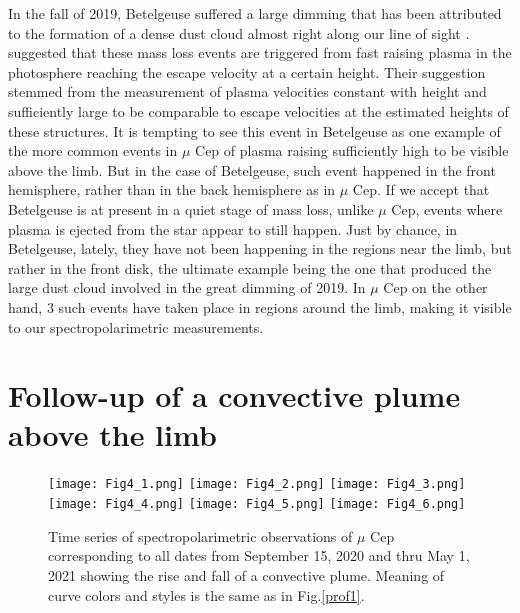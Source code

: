 \documentclass{/Users/art2/TeX/aanda/aa}
\begin{document}
In the fall of 2019, Betelgeuse suffered a large dimming that has been attributed to the formation of a dense dust cloud almost right along our line of sight \citep{montarges_dimming_2021}. \cite{LA22} suggested that these mass loss events are triggered from fast raising plasma in the photosphere reaching the escape velocity at a certain height. Their suggestion stemmed from the measurement of plasma velocities constant with height and sufficiently large to be comparable to escape velocities at the estimated heights of these structures. It is tempting to see this event in Betelgeuse as one example of the more common events in $\mu$ Cep of plasma raising sufficiently high to be visible above the limb. But in the case of Betelgeuse, such event happened in the front hemisphere, rather than in the back hemisphere as in $\mu$ Cep. If we accept that Betelgeuse is at present in a quiet stage of mass loss, unlike $\mu$ Cep, events where plasma is ejected from the star appear to still happen.
Just  by chance,  in Betelgeuse, lately, they have not been happening in the regions near the limb, but rather in the front disk, the ultimate example being the one that produced the large dust cloud involved in the great dimming of 2019. In $\mu$ Cep on the other hand, 3 such events have taken place in regions around the limb, making it visible to our spectropolarimetric measurements.

 


\section{Follow-up of a convective plume above the limb}

\begin{figure*}
\texttt{[image: Fig4\_1.png]}
\texttt{[image: Fig4\_2.png]}
\texttt{[image: Fig4\_3.png]}
\texttt{[image: Fig4\_4.png]}
\texttt{[image: Fig4\_5.png]}
\texttt{[image: Fig4\_6.png]}
\caption{Time series of spectropolarimetric observations of $\mu$ Cep corresponding to all dates from September 15, 2020 and thru May 1, 2021 showing the rise and fall of a convective plume. Meaning of curve colors and styles is the same as in Fig.\ref{prof1}.}
\label{fall}
\end{figure*}
\end{document}
